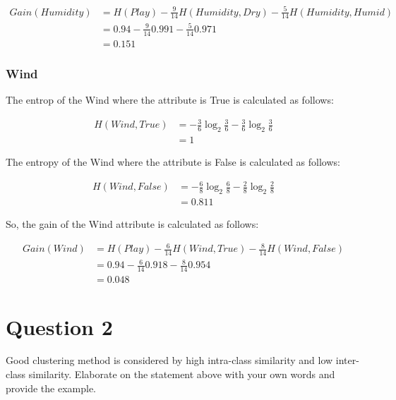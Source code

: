 \documentclass[
  11pt, %
]{assignment}
\begin{document}
\begin{equation}
	\label{eq:gain-humidity}
	\begin{split}
		Gain(Humidity) &= H(Play) - \frac{9}{14} H(Humidity, Dry) - \frac{5}{14} H(Humidity, Humid) \\
		&= 0.94 - \frac{9}{14} 0.991 - \frac{5}{14} 0.971 \\
		&= 0.151
	\end{split}
\end{equation}

\subsubsection*{Wind}

The entrop of the Wind where the attribute is True is calculated as follows:

\begin{equation}
	\label{eq:entropy-wind-true}
	\begin{split}
		H(Wind, True) &= -\frac{3}{6} \log_2 \frac{3}{6} - \frac{3}{6} \log_2 \frac{3}{6} \\
		&= 1
	\end{split}
\end{equation}

The entropy of the Wind where the attribute is False is calculated as follows:

\begin{equation}
	\label{eq:entropy-wind-false}
	\begin{split}
		H(Wind, False) &= -\frac{6}{8} \log_2 \frac{6}{8} - \frac{2}{8} \log_2 \frac{2}{8} \\
		&= 0.811
	\end{split}
\end{equation}

So, the gain of the Wind attribute is calculated as follows:

\begin{equation}
	\label{eq:gain-wind}
	\begin{split}
		Gain(Wind) &= H(Play) - \frac{6}{14} H(Wind, True) - \frac{8}{14} H(Wind, False) \\
		&= 0.94 - \frac{6}{14} 0.918 - \frac{8}{14} 0.954 \\
		&= 0.048
	\end{split}
\end{equation}


\section*{Question 2}
\begin{problem}
Good clustering method is considered by high intra-class similarity and low inter-class similarity. Elaborate on the statement above with your own words and provide the example.
\end{problem}
\end{document}
